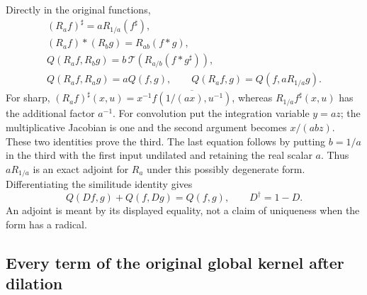 Directly in the original functions,
\begin{equation}\tag{GDT5}
 \begin{gathered}
 (R_af)^\sharp=aR_{1/a}(f^\sharp),\\
 (R_af)*(R_bg)=R_{ab}(f*g),\\
 Q(R_af,R_bg)=b\,\mathscr T\!\left(R_{a/b}(f*g^\sharp)\right),\\
 Q(R_af,R_ag)=aQ(f,g),\qquad
 Q(R_af,g)=Q(f,aR_{1/a}g).
 \end{gathered}
\end{equation}
For sharp, $(R_af)^\sharp(x,u)=
x^{-1}\overline{f(1/(ax),u^{-1})}$, whereas
$R_{1/a}f^\sharp(x,u)$ has the additional factor $a^{-1}$.
For convolution put the integration variable $y=az$;
the multiplicative Jacobian is one and the second argument
becomes $x/(abz)$. These two identities prove the third.
The last equation follows by putting $b=1/a$ in the third
with the first input undilated and retaining the real
scalar $a$. Thus $aR_{1/a}$ is an exact adjoint for $R_a$
under this possibly degenerate form. Differentiating the
similitude identity gives
\begin{equation}\tag{GDT6}
 Q(Df,g)+Q(f,Dg)=Q(f,g),\qquad D^\dagger=1-D.
\end{equation}
An adjoint is meant by its displayed equality, not a claim
of uniqueness when the form has a radical.

\subsection{Every term of the original global kernel after dilation}

